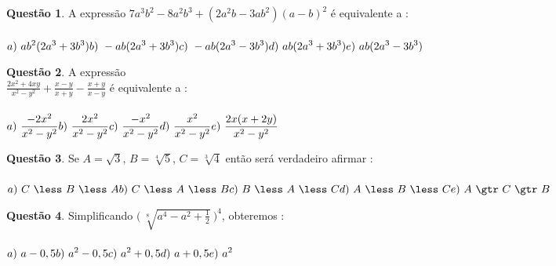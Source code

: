 \documentclass[11pt, twocolumn]{article}
\renewcommand{\=}[1]{\stackrel{#1}{=}} 																					%
\theoremstyle{definition}
\newtheorem{quest}{Quest\~ao}
\begin{document}
\hline
\vfill

\begin{quest}
	A express\~ao \(7a^3b^2-8a^2b^3+(2a^2b-3ab^2)(a-b)^2\) \'e equivalente a : \\ \\
	\(\displaystyle a)\ ab^2(2a^3+3b^3) \hfill b)\ -ab(2a^3+3b^3) \\ \\ \hfill c)\ -ab(2a^3-3b^3) \hfill  d)\ ab(2a^3+3b^3) \hfill \\ \\ e)\ ab(2a^3-3b^3) \)
\end{quest}

\hline
\vfill

\begin{quest}
	A express\~ao \\ \(\displaystyle \frac{2x^2+4xy}{x^2-y^2} + \frac{x-y}{x+y} - \frac{x+y}{x-y}\) \'e equivalente a : \\ \\
	\(\displaystyle a)\ \frac{-2x^2}{x^2-y^2} \hfill b)\ \frac{2x^2}{x^2-y^2} \hfill \\ \\ c)\ \frac{-x^2}{x^2-y^2} \hfill  d)\ \frac{x^2}{x^2-y^2} \hfill \\ \\ e)\ \frac{2x(x+2y)}{x^2-y^2} \)
\end{quest}

\hline
\vfill

\begin{quest}
	Se $A = \sqrt{3}$, $B = \sqrt[4]{5}$, $C = \sqrt[3]{4}$ ent\~ao ser\'a verdadeiro afirmar : \\ \\
	\(\displaystyle a)\ C\ \less\ B\ \less\ A \hfill b)\ C\ \less\ A\ \less\ B \hfill \\ c)\ B\ \less\ A\ \less\ C \hfill d)\ A\ \less\ B\ \less\ C \hfill \\ e)\ A\ \gtr\ C\ \gtr\ B \)
\end{quest}

\hline
\vfill

\begin{quest}
	Simplificando \(\displaystyle \bigg(\ \sqrt[8]{a^4-a^2+\frac{1}{2}}\ \bigg)^4\), obteremos : \\ \\
	\(\displaystyle a)\ a - 0,5 \hfill b)\ a^2 - 0,5 \hfill c)\ a^2 + 0,5 \hfill \\ \\ d)\ a + 0,5 \hfill e)\ a^2 \)
\end{quest}
\end{document}
